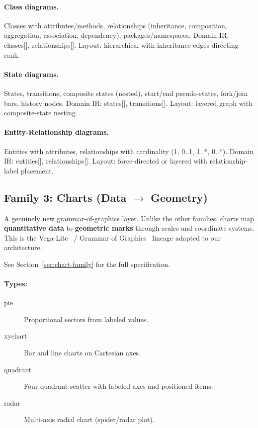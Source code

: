 \paragraph{Class diagrams.} Classes with attributes/methods, relationships
(inheritance, composition, aggregation, association, dependency), packages/namespaces.
Domain IR: classes[], relationships[]. Layout: hierarchical with inheritance edges
directing rank.

\paragraph{State diagrams.} States, transitions, composite states (nested), start/end
pseudo-states, fork/join bars, history nodes. Domain IR: states[], transitions[].
Layout: layered graph with composite-state nesting.

\paragraph{Entity-Relationship diagrams.} Entities with attributes, relationships with
cardinality (1, 0..1, 1..*, 0..*). Domain IR: entities[], relationships[].
Layout: force-directed or layered with relationship-label placement.

\subsection{Family 3: Charts (Data $\to$ Geometry)}
\label{sec:family-charts-overview}

A genuinely new grammar-of-graphics layer. Unlike the other families, charts map
\textbf{quantitative data} to \textbf{geometric marks} through scales and coordinate
systems. This is the Vega-Lite~\cite{vegalite2017} / Grammar of
Graphics~\cite{grammarofgraphics2005} lineage adapted to our architecture.

See Section~\ref{sec:chart-family} for the full specification.

\paragraph{Types:}
\begin{description}
  \item[pie] Proportional sectors from labeled values.
  \item[xychart] Bar and line charts on Cartesian axes.
  \item[quadrant] Four-quadrant scatter with labeled axes and positioned items.
  \item[radar] Multi-axis radial chart (spider/radar plot).
\end{description}

